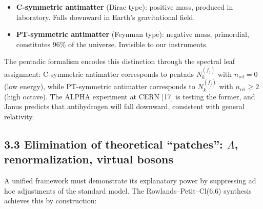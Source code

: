 \documentclass[11pt]{article}
\providecommand{\tightlist}{\setlength{\itemsep}{2pt}\setlength{\parskip}{6pt}}
\providecommand{\tightlist}{%
  \setlength{\itemsep}{2pt}\setlength{\parskip}{6pt}
}
\begin{document}
\begin{itemize}
\tightlist
\item
  \textbf{C-symmetric antimatter} (Dirac type): positive mass, produced
  in laboratory. Falls downward in Earth's gravitational field.
\item
  \textbf{PT-symmetric antimatter} (Feynman type): negative mass,
  primordial, constitutes 96\% of the universe. Invisible to our
  instruments.
\end{itemize}

The pentadic formalism encodes this distinction through the spectral
leaf assignment: C-symmetric antimatter corresponds to pentads
\(N_k^{(f_j)}\) with \(n_{\text{rel}} = 0\) (low energy), while
PT-symmetric antimatter corresponds to \(N_k^{(f_j)}\) with
\(n_{\text{rel}} \ge 2\) (high octave). The ALPHA experiment at CERN
{[}17{]} is testing the former, and Janus predicts that antihydrogen
will fall downward, consistent with general relativity.

\hypertarget{elimination-of-theoretical-patches-lambda-renormalization-virtual-bosons}{%
\subsection{\texorpdfstring{3.3 Elimination of theoretical ``patches'':
\(\Lambda\), renormalization, virtual
bosons}{3.3 Elimination of theoretical ``patches'': \textbackslash Lambda, renormalization, virtual bosons}}\label{elimination-of-theoretical-patches-lambda-renormalization-virtual-bosons}}

A unified framework must demonstrate its explanatory power by
suppressing ad hoc adjustments of the standard model. The
Rowlands--Petit--Cl(6,6) synthesis achieves this by construction:
\end{document}

